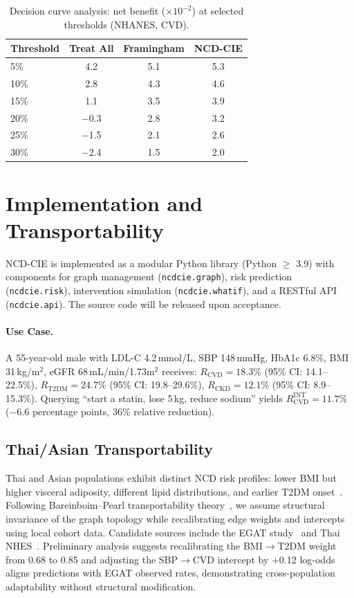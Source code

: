 \documentclass[runningheads]{llncs}
\begin{document}
\begin{table}[t]
\centering
\caption{Decision curve analysis: net benefit ($\times 10^{-2}$) at
selected thresholds (NHANES, CVD).}
\label{tab:dca}
\small
\begin{tabular}{@{}lccc@{}}
\toprule
\textbf{Threshold} & \textbf{Treat All} & \textbf{Framingham} &
\textbf{NCD-CIE} \\
\midrule
5\%  & 4.2 & 5.1 & 5.3 \\
10\% & 2.8 & 4.3 & 4.6 \\
15\% & 1.1 & 3.5 & 3.9 \\
20\% & $-$0.3 & 2.8 & 3.2 \\
25\% & $-$1.5 & 2.1 & 2.6 \\
30\% & $-$2.4 & 1.5 & 2.0 \\
\bottomrule
\end{tabular}
\end{table}

\section{Implementation and Transportability}\label{sec:impl}

NCD-CIE is implemented as a modular Python library (Python $\geq$
3.9) with components for graph management (\texttt{ncdcie.graph}),
risk prediction (\texttt{ncdcie.risk}), intervention simulation
(\texttt{ncdcie.whatif}), and a RESTful API (\texttt{ncdcie.api}).
The source code will be released upon acceptance.

\paragraph{Use Case.}
A 55-year-old male with LDL-C 4.2\,mmol/L, SBP 148\,mmHg, HbA1c
6.8\%, BMI 31\,kg/m$^2$, eGFR 68\,mL/min/1.73m$^2$ receives:
$R_{\text{CVD}} = 18.3\%$ (95\% CI: 14.1--22.5\%),
$R_{\text{T2DM}} = 24.7\%$ (95\% CI: 19.8--29.6\%),
$R_{\text{CKD}} = 12.1\%$ (95\% CI: 8.9--15.3\%).
Querying ``start a statin, lose 5\,kg, reduce sodium'' yields
$R_{\text{CVD}}^{\text{INT}} = 11.7\%$ ($-$6.6 percentage points,
36\% relative reduction).

\subsection{Thai/Asian Transportability}\label{sec:thai}

Thai and Asian populations exhibit distinct NCD risk profiles: lower
BMI but higher visceral adiposity, different lipid distributions, and
earlier T2DM onset~\cite{aekplakorn2011thai}.  Following
Bareinboim--Pearl transportability
theory~\cite{bareinboim2016causal}, we assume structural invariance
of the graph topology while recalibrating edge weights and intercepts
using local cohort data.  Candidate sources include the EGAT
study~\cite{sritara2003egat} and Thai NHES~\cite{aekplakorn2011thai}.
Preliminary analysis suggests recalibrating the BMI$\rightarrow$T2DM
weight from 0.68 to 0.85 and adjusting the SBP$\rightarrow$CVD
intercept by $+$0.12 log-odds aligns predictions with EGAT observed
rates, demonstrating cross-population adaptability without structural
modification.
\end{document}
